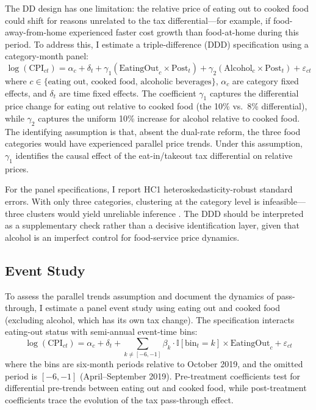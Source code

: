 \documentclass[12pt]{article}
\newcommand{\ind}{\mathbb{I}}
\begin{document}
The DD design has one limitation: the relative price of eating out to cooked food could shift for reasons unrelated to the tax differential---for example, if food-away-from-home experienced faster cost growth than food-at-home during this period. To address this, I estimate a triple-difference (DDD) specification using a category-month panel:
\begin{equation}
\log(\text{CPI}_{ct}) = \alpha_c + \delta_t + \gamma_1 (\text{EatingOut}_c \times \text{Post}_t) + \gamma_2 (\text{Alcohol}_c \times \text{Post}_t) + \varepsilon_{ct}
\label{eq:ddd}
\end{equation}
where $c \in \{\text{eating out, cooked food, alcoholic beverages}\}$, $\alpha_c$ are category fixed effects, and $\delta_t$ are time fixed effects. The coefficient $\gamma_1$ captures the differential price change for eating out relative to cooked food (the 10\% vs.\ 8\% differential), while $\gamma_2$ captures the uniform 10\% increase for alcohol relative to cooked food. The identifying assumption is that, absent the dual-rate reform, the three food categories would have experienced parallel price trends. Under this assumption, $\gamma_1$ identifies the causal effect of the eat-in/takeout tax differential on relative prices.

For the panel specifications, I report HC1 heteroskedasticity-robust standard errors. With only three categories, clustering at the category level is infeasible---three clusters would yield unreliable inference \citep{cameron2008bootstrap}. The DDD should be interpreted as a supplementary check rather than a decisive identification layer, given that alcohol is an imperfect control for food-service price dynamics.

\subsection{Event Study}

To assess the parallel trends assumption and document the dynamics of pass-through, I estimate a panel event study using eating out and cooked food (excluding alcohol, which has its own tax change). The specification interacts eating-out status with semi-annual event-time bins:
\begin{equation}
\log(\text{CPI}_{ct}) = \alpha_c + \delta_t + \sum_{k \neq [-6,-1]} \beta_k \cdot \ind[\text{bin}_t = k] \times \text{EatingOut}_c + \varepsilon_{ct}
\label{eq:event}
\end{equation}
where the bins are six-month periods relative to October 2019, and the omitted period is $[-6, -1]$ (April--September 2019). Pre-treatment coefficients test for differential pre-trends between eating out and cooked food, while post-treatment coefficients trace the evolution of the tax pass-through effect.
\end{document}
